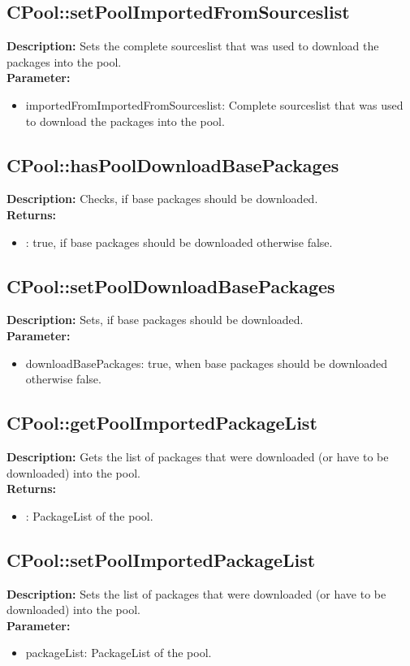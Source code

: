 \subsection{CPool::setPoolImportedFromSourceslist}
\textbf{Description:} Sets the complete sourceslist that was used to download the packages into the pool.\\
\textbf{Parameter:}
\begin{itemize}
\item importedFromImportedFromSourceslist: Complete sourceslist that was used to download the packages into the pool.
\end{itemize}

\subsection{CPool::hasPoolDownloadBasePackages}
\textbf{Description:} Checks, if base packages should be downloaded.\\
\textbf{Returns:}
\begin{itemize}
\item : true, if base packages should be downloaded otherwise false.
\end{itemize}

\subsection{CPool::setPoolDownloadBasePackages}
\textbf{Description:} Sets, if base packages should be downloaded.\\
\textbf{Parameter:}
\begin{itemize}
\item downloadBasePackages: true, when base packages should be downloaded otherwise false.
\end{itemize}

\subsection{CPool::getPoolImportedPackageList}
\textbf{Description:} Gets the list of packages that were downloaded (or have to be downloaded) into the pool.\\
\textbf{Returns:}
\begin{itemize}
\item : PackageList of the pool.
\end{itemize}

\subsection{CPool::setPoolImportedPackageList}
\textbf{Description:} Sets the list of packages that were downloaded (or have to be downloaded) into the pool.\\
\textbf{Parameter:}
\begin{itemize}
\item packageList: PackageList of the pool.
\end{itemize}

